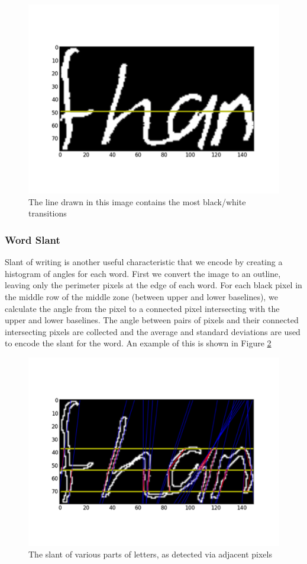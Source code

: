 \documentclass[paper=a4, fontsize=11pt]{scrartcl} %
\numberwithin{equation}{section} %
\numberwithin{figure}{section} %
\numberwithin{table}{section} %
\begin{document}
\begin{figure}
  \includegraphics{wordwidth.png}
  \caption{The line drawn in this image contains the most black/white
    transitions}
  \label{fig:wordwidth}
\end{figure}

\subsubsection{Word Slant}
Slant of writing is another useful characteristic that we encode by
creating a histogram of angles for each word. First we convert the
image to an outline, leaving only the perimeter pixels at the edge of
each word. For each black pixel in the middle row of the middle zone
(between upper and lower baselines), we calculate the angle from the
pixel to a connected pixel intersecting with the upper and lower
baselines. The angle between pairs of pixels and their connected
intersecting pixels are collected and the average and standard
deviations are used to encode the slant for the word. An example of
this is shown in Figure \ref{fig:wordslant}

\begin{figure}
  \includegraphics{wordslant.png}
  \caption{The slant of various parts of letters, as detected via
    adjacent pixels}
  \label{fig:wordslant}
\end{figure}
\end{document}
